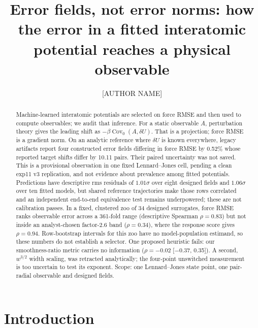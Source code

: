 \documentclass[aip,jcp,reprint,amsmath,amssymb,floatfix]{revtex4-2}
\begin{document}
\title{Error fields, not error norms: how the error in a fitted interatomic
potential reaches a physical observable}

\author{[AUTHOR NAME]}
\email{[EMAIL]}
\affiliation{[AFFILIATION]}

\begin{abstract}
Machine-learned interatomic potentials are selected on force RMSE and then used
to compute observables; we audit that inference. For a static observable $A$,
perturbation theory gives the leading shift as $-\beta\operatorname{Cov}_0(A,
\delta U)$. That is a projection; force RMSE is a gradient norm. On an analytic
reference where $\delta U$ is known
everywhere, legacy artifacts report four constructed error fields differing in
force RMSE by 0.52\% whose reported target shifts differ by 10.11 pairs. Their
paired uncertainty was not saved. This is a provisional observation in one
fixed Lennard--Jones cell,
pending a clean exp11 v3 replication, and not evidence about prevalence among fitted
potentials. Predictions have descriptive rms residuals of $1.01\sigma$ over
eight designed fields and $1.06\sigma$ over ten
fitted models, but shared reference trajectories make those rows correlated and
an independent end-to-end equivalence test remains underpowered; these are not
calibration passes. In a fixed, clustered zoo of 34 designed surrogates, force
RMSE ranks observable error across a 361-fold range (descriptive Spearman
$\rho=0.83$) but not inside an analyst-chosen factor-2.6 band ($\rho=0.34$),
where the response score gives $\rho=0.94$. Row-bootstrap intervals for this zoo
have no model-population estimand, so these numbers do not establish a selector.
One proposed heuristic fails: our smoothness-ratio metric carries no information
($\rho = -0.02$ [$-0.37$, 0.35]). A second, $w^{3/2}$ width scaling, was
retracted analytically; the four-point unswitched measurement is too uncertain
to test its exponent. Scope: one Lennard--Jones state point, one pair-radial
observable and designed fields.
\end{abstract}

\maketitle

\section{Introduction}
\label{sec:intro}
\end{document}
